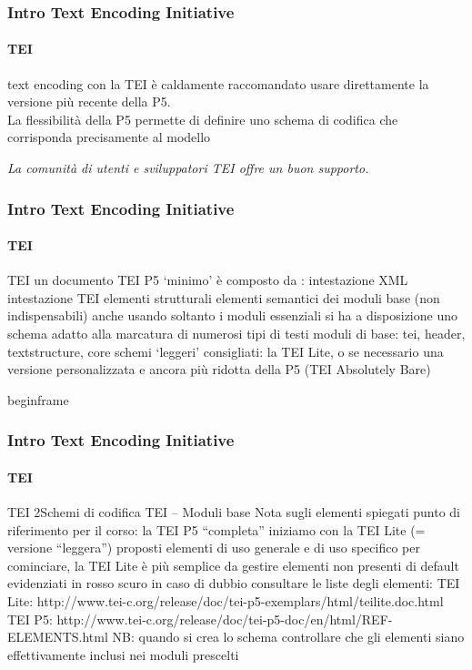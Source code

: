 \begin{frame}
	\frametitle{Intro Text Encoding Initiative}
	\framesubtitle{TEI}
	\addtocounter{nframe}{1}

	\begin{block}{text encoding con la TEI}
		è caldamente raccomandato usare direttamente la
		versione più recente della P5.\\
		La flessibilità della P5 permette di definire uno schema di
		codifica che corrisponda precisamente al modello
    \end{block}
    
    \textit{La comunità di utenti e sviluppatori TEI offre un buon supporto.}

\end{frame}





\begin{frame}
	\frametitle{Intro Text Encoding Initiative}
	\framesubtitle{TEI}
	\addtocounter{nframe}{1}

	\begin{block}{TEI}
        un documento TEI P5 ‘minimo’ è composto da :
        intestazione XML
        intestazione TEI
        elementi strutturali
        elementi semantici dei moduli base (non indispensabili)
        anche usando soltanto i moduli essenziali si ha a disposizione
        uno schema adatto alla marcatura di numerosi tipi di testi
        moduli di base: tei, header, textstructure, core
        schemi ‘leggeri’ consigliati: la TEI Lite, o se necessario una
        versione personalizzata e ancora più ridotta della P5 (TEI
        Absolutely Bare)
    \end{block}
    
   

\end{frame}




begin{frame}
	\frametitle{Intro Text Encoding Initiative}
	\framesubtitle{TEI}
	\addtocounter{nframe}{1}

	\begin{block}{TEI}
        2Schemi di codifica TEI – Moduli base
        Nota sugli elementi spiegati
        punto di riferimento per il corso: la TEI P5 “completa”
        iniziamo con la TEI Lite (= versione “leggera”)
        proposti elementi di uso generale e di uso specifico
        per cominciare, la TEI Lite è più semplice da gestire
        elementi non presenti di default evidenziati in rosso scuro
        in caso di dubbio consultare le liste degli elementi:
        TEI Lite: http://www.tei-c.org/release/doc/tei-p5-exemplars/html/teilite.doc.html
        TEI P5: http://www.tei-c.org/release/doc/tei-p5-doc/en/html/REF-ELEMENTS.html
        NB: quando si crea lo schema controllare che gli elementi
        siano effettivamente inclusi nei moduli prescelti
    \end{block}
    
